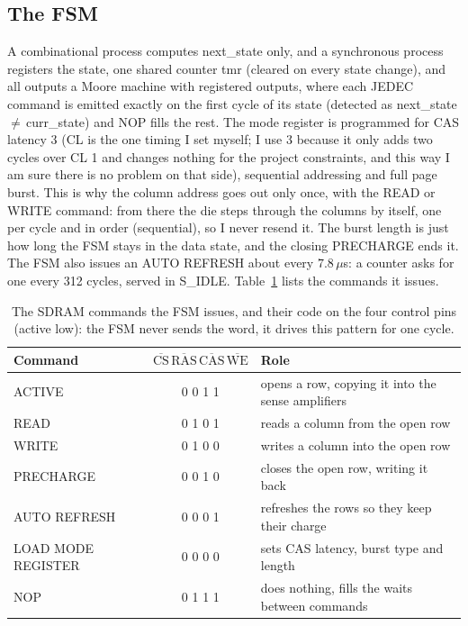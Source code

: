 \documentclass[a4paper,10pt]{article}
\begin{document}
\subsection{The FSM}

A combinational process
computes next\_state only, and a synchronous process registers the state,
one shared counter tmr (cleared on every state change), and all
outputs a Moore machine with registered outputs, where each JEDEC command is
emitted exactly on the first cycle of its state (detected as
next\_state\,$\neq$\,curr\_state) and NOP fills the rest. The mode register is
programmed for CAS latency 3 (CL is the one timing I set myself; I use 3 because it only
adds two cycles over CL 1 and changes nothing for the project constraints, and this way I am sure there is no
problem on that side), sequential addressing and full page burst. This is why the
column address goes out only once, with the READ or WRITE command: from there the die
steps through the columns by itself, one per cycle and in order (sequential), so I never
resend it. The burst length is just how long the FSM stays in the data state, and the
closing PRECHARGE ends it. The FSM also issues an AUTO
REFRESH about every $7.8\,\mu$s: a counter asks for one every 312 cycles, served in
S\_IDLE. Table~\ref{tab:sdram-cmd} lists the commands it issues.

\begin{table}[H]
\centering
\caption{The SDRAM commands the FSM issues, and their code on the four control pins
(active low): the FSM never sends the word, it drives this pattern for one cycle.}
\label{tab:sdram-cmd}
\small
\begin{tabular}{l c l}
\toprule
\textbf{Command} & \textbf{$\overline{\mathrm{CS}}\,\overline{\mathrm{RAS}}\,\overline{\mathrm{CAS}}\,\overline{\mathrm{WE}}$} & \textbf{Role} \\
\midrule
ACTIVE             & 0 0 1 1 & opens a row, copying it into the sense amplifiers \\
READ               & 0 1 0 1 & reads a column from the open row \\
WRITE              & 0 1 0 0 & writes a column into the open row \\
PRECHARGE          & 0 0 1 0 & closes the open row, writing it back \\
AUTO REFRESH       & 0 0 0 1 & refreshes the rows so they keep their charge \\
LOAD MODE REGISTER & 0 0 0 0 & sets CAS latency, burst type and length \\
NOP                & 0 1 1 1 & does nothing, fills the waits between commands \\
\bottomrule
\end{tabular}
\end{table}
\end{document}
